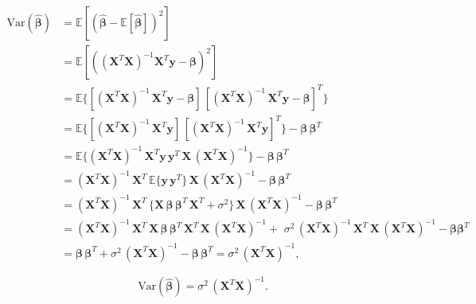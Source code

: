 \begin{align*}
\mbox{Var}(\boldsymbol{\hat{\beta}}) 
&= \mathbb{E}[(\boldsymbol{\hat\beta} - \mathbb{E}[\boldsymbol{\hat\beta}])^2 ]
\\
&= \mathbb{E}[((\mathbf{X}^T\mathbf{X})^{-1}\mathbf{X}^T\mathbf{y}-\boldsymbol\beta)^2] 
\\
&= \mathbb{E} \{ [(\mathbf{X}^{T} \mathbf{X})^{-1} \, \mathbf{X}^{T} \mathbf{y} - \boldsymbol{\beta}] \, [(\mathbf{X}^{T} \mathbf{X})^{-1} \, \mathbf{X}^{T} \mathbf{y} - \boldsymbol{\beta}]^{T} \}
\\
&=  \mathbb{E} \{ [(\mathbf{X}^{T} \mathbf{X})^{-1} \, \mathbf{X}^{T} \mathbf{y}] \, [(\mathbf{X}^{T} \mathbf{X})^{-1} \, \mathbf{X}^{T} \mathbf{y}]^{T} \} - \boldsymbol{\beta} \, \boldsymbol{\beta}^{T}
\\
&=  \mathbb{E} \{ (\mathbf{X}^{T} \mathbf{X})^{-1} \, \mathbf{X}^{T} \mathbf{y} \, \mathbf{y}^{T} \, \mathbf{X} \, (\mathbf{X}^{T} \mathbf{X})^{-1}  \} - \boldsymbol{\beta} \, \boldsymbol{\beta}^{T}
\\
&= (\mathbf{X}^{T} \mathbf{X})^{-1} \, \mathbf{X}^{T} \, \mathbb{E} \{ \mathbf{y} \, \mathbf{y}^{T} \} \, \mathbf{X} \, (\mathbf{X}^{T} \mathbf{X})^{-1} - \boldsymbol{\beta} \, \boldsymbol{\beta}^{T}
\\
&= (\mathbf{X}^{T} \mathbf{X})^{-1} \, \mathbf{X}^{T} \, \{ \mathbf{X} \, \boldsymbol{\beta} \, \boldsymbol{\beta}^{T} \,  \mathbf{X}^{T} + \sigma^2 \} \, \mathbf{X} \, (\mathbf{X}^{T} \mathbf{X})^{-1} - \boldsymbol{\beta} \, \boldsymbol{\beta}^{T}
\\
&= (\mathbf{X}^T \mathbf{X})^{-1} \, \mathbf{X}^T \, \mathbf{X} \, \boldsymbol{\beta} \, \boldsymbol{\beta}^T \,  \mathbf{X}^T \, \mathbf{X} \, (\mathbf{X}^T  \mathbf{X})^{-1} +  \, \, \sigma^2 \, (\mathbf{X}^T \mathbf{X})^{-1} \, \mathbf{X}^T  \, \mathbf{X} \, (\mathbf{X}^T \mathbf{X})^{-1} - \boldsymbol{\beta} \boldsymbol{\beta}^T
\\
&= \boldsymbol{\beta} \, \boldsymbol{\beta}^{T}  + \sigma^2 \, (\mathbf{X}^{T} \mathbf{X})^{-1} - \boldsymbol{\beta} \, \boldsymbol{\beta}^{T}
 =  \sigma^2 \, (\mathbf{X}^{T} \mathbf{X})^{-1},
\end{align*}

\begin{equation}\label{eq:var_beta}
\mbox{Var}(\boldsymbol{\hat{\beta}})  = \sigma^2 \, (\mathbf{X}^{T} \mathbf{X})^{-1}.
\end{equation}
